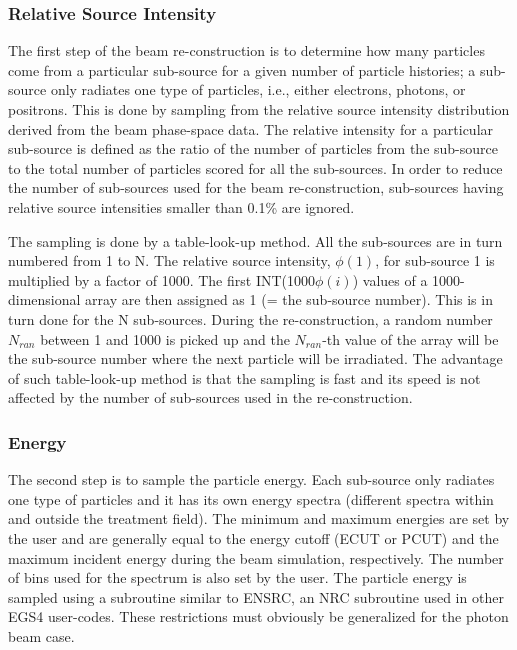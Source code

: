 \documentclass[12pt,twoside]{article}
\begin{document}
\subsubsection{Relative Source Intensity}
The first step of the beam re-construction is to determine how many particles come from a particular sub-source for a given number of particle histories; a sub-source only radiates one type of particles, i.e., either electrons, photons, or positrons. This is done by sampling from the relative source intensity distribution derived from the beam phase-space data. The relative intensity for a particular sub-source is defined as the ratio of the number of particles from the sub-source to the total number of particles scored for all the sub-sources. In order to reduce the number of sub-sources used for the beam re-construction, sub-sources having relative source intensities smaller than 0.1\% are ignored.

The sampling is done by a table-look-up method. All the sub-sources are in
turn numbered from 1 to N. The relative source intensity, $\phi(1)$, for
sub-source 1 is multiplied by a factor of 1000. The first
INT(1000$\phi(i)$) values of a 1000-dimensional array are then assigned as
1 (= the sub-source number). This is in turn done for the N sub-sources.
During the re-construction, a random number $N_{ran}$ between 1 and 1000
is picked up and the $N_{ran}$-th value of the array will be the
sub-source number where the next particle will be irradiated.  The
advantage of such table-look-up method is that the sampling is fast and
its speed is not affected by the number of sub-sources used in the
re-construction.


\subsubsection{Energy}

The second step is to sample the particle energy.  Each sub-source only
radiates one type of particles and it has its own energy spectra
(different spectra within and outside the treatment field). The minimum
and maximum energies are set by the user and are generally equal to the
energy cutoff (ECUT or PCUT) and the maximum incident energy during the
beam simulation, respectively. The number of bins used for the spectrum is
also set by the user. The particle energy is sampled using a subroutine
similar to ENSRC, an NRC subroutine used in other EGS4 user-codes.
These restrictions must obviously be generalized for the photon beam
case.
\end{document}
